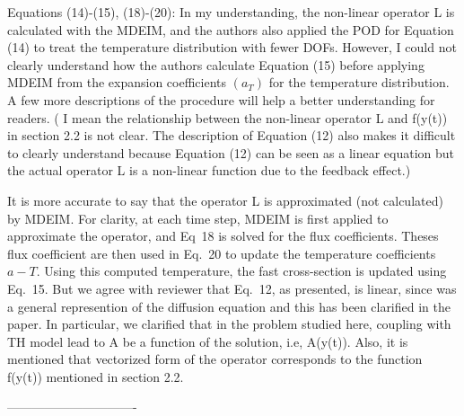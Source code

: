 \documentclass[10pt]{article}
\begin{document}
\begin{response}
	{
		Equations (14)-(15), (18)-(20):
		In my understanding, the non-linear operator L is calculated with the MDEIM, and the authors also applied the POD for Equation (14) to treat the temperature distribution with fewer DOFs.
		However, I could not clearly understand how the authors calculate Equation (15) before applying MDEIM from the expansion coefficients $(a_T)$ for the temperature distribution. A few more descriptions of the procedure will help a better understanding for readers.
		( I mean the relationship between the non-linear operator L and f(y(t)) in section 2.2 is not clear. The description of Equation (12) also makes it difficult to clearly understand because Equation (12) can be seen as a linear equation but the actual operator L is a non-linear function due to the feedback effect.)
	}

It is more accurate to say that the operator L is approximated (not calculated) by MDEIM.
For clarity, at each time step, MDEIM is first applied to approximate the operator, and Eq~18 is solved for the flux coefficients.
Theses flux coefficient are then used in Eq.~20 to update the temperature coefficients $a-T$.
Using this computed temperature, the fast cross-section is updated using Eq.~15.
But we agree with reviewer that Eq.~12, as presented, is linear, since was a general represention of the diffusion equation and this has been clarified in the paper.
In particular, we clarified that in the problem studied here, coupling with TH model lead to A be a function of the solution, i.e, A(y(t)).
Also, it is mentioned that vectorized form of the operator corresponds to the function f(y(t)) mentioned in section 2.2.



\end{response}

-------------------------------
\end{document}

